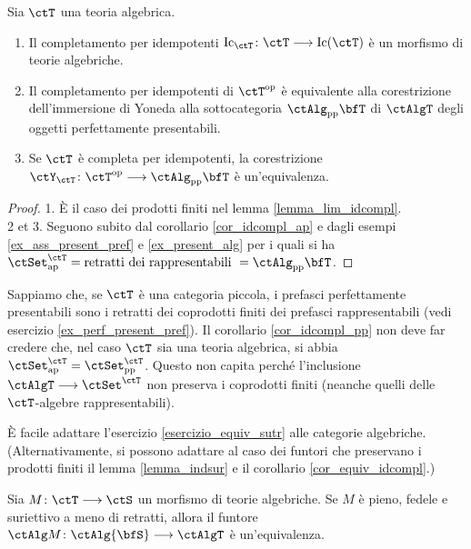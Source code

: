 \begin{corollary}\label{cor_idcompl_pp}
 Sia \(\ctT\) una teoria algebrica.
 \begin{enumerate}
  \item Il completamento per idempotenti \(\mathrm{Ic}_{\ctT} \colon \ctT \fun \mathrm{Ic}(\ctT)\) è un morfismo di
        teorie algebriche.
  \item Il completamento per idempotenti di \(\ctT^{\op}\) è equivalente alla corestrizione dell'immersione di Yoneda
        alla sottocategoria \(\ctAlg_{\mathrm{pp}}{\bfT}\) di \(\ctAlgT\) degli oggetti perfettamente presentabili.
  \item Se \(\ctT\) è completa per idempotenti, la corestrizione
        \(\ctY_{\ctT} \colon \ctT^{\op} \fun \ctAlg_{\mathrm{pp}}{\bfT}\) è un'equivalenza.
 \end{enumerate}
\end{corollary}

\begin{proof}
 1. È il caso dei prodotti finiti nel lemma \ref{lemma_lim_idcompl}. \\
 2 et 3. Seguono subito dal corollario \ref{cor_idcompl_ap} e dagli esempi \ref{ex_ass_present_pref} e \ref{ex_present_alg}
 per i quali si ha \(\ctSet^{\ctT}_{\mathrm{ap}} = \mbox{retratti dei rappresentabili } = \ctAlg_{\mathrm{pp}}{\bfT}\).
\end{proof}

\begin{remark}\label{oss_ap_pp}
 Sappiamo che, se \(\ctT\) è una categoria piccola, i prefasci perfettamente presentabili sono i retratti dei coprodotti finiti dei
 prefasci rappresentabili (vedi esercizio \ref{ex_perf_present_pref}). Il corollario \ref{cor_idcompl_pp} non deve far credere che,
 nel caso \(\ctT\) sia una teoria algebrica, si abbia \(\ctSet^{\ctT}_{\mathrm{ap}} = \ctSet^{\ctT}_{\mathrm{pp}}\). Questo non capita
 perché l'inclusione \(\ctAlgT \fun \ctSet^{\ctT}\) non preserva i coprodotti finiti (neanche quelli delle \(\ctT\)-algebre rappresentabili).
\end{remark}

È facile adattare l'esercizio \ref{esercizio_equiv_sutr} alle categorie algebriche.
(Alternativamente, si possono adattare al caso dei funtori che preservano i prodotti finiti il lemma \ref{lemma_indsur}
e il corollario \ref{cor_equiv_idcompl}.)

\begin{lemma}\label{lemma_AlgM_equiv}
 Sia \(M \colon \ctT \fun \ctS\) un morfismo di teorie algebriche.
 Se \(M\) è pieno, fedele e suriettivo a meno di retratti,
 allora il funtore \(\ctAlg M \colon \ctAlg{\bfS} \fun \ctAlgT\) è un'equivalenza.
\end{lemma}

